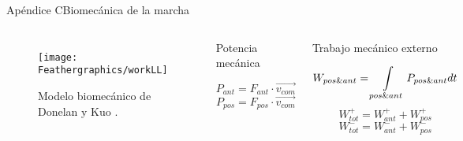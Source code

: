 \documentclass[10pt]{beamer}
\begin{document}
\begin{frame}{Apéndice C}{Biomecánica de la marcha}
\begin{columns}
\column{75 mm}
\begin{figure}
\begin{centering}
\texttt{[image: Feathergraphics/workLL]}
\par\end{centering}
\caption{Modelo biomecánico de Donelan y Kuo \cite{Donelan2002}.}
\end{figure}
\column{45 mm}
\begin{block}{{\footnotesize Potencia mecánica}}
\begin{footnotesize}
\begin{equation}
P_{ant}=F_{ant}\cdot\overrightarrow{v_{com}}
\end{equation}
\begin{equation}
P_{pos}=F_{pos}\cdot\overrightarrow{v_{com}}
\end{equation}
\end{footnotesize}
\end{block}
\begin{block}{{\footnotesize Trabajo mecánico externo}}
\begin{footnotesize}
\begin{equation}
W_{pos\&ant}=\intop_{pos\&ant}P_{pos\&ant}dt
\end{equation}
\begin{equation}
W_{tot}^{+}=W_{ant}^{+}+W_{pos}^{+}
\end{equation}
\begin{equation}
W_{tot}^{-}=W_{ant}^{-}+W_{pos}^{-}
\end{equation}
\end{footnotesize}
\end{block}
\end{columns}
\end{frame}
\setcounter{framenumber}{\value{finalframe}}
\end{document}
